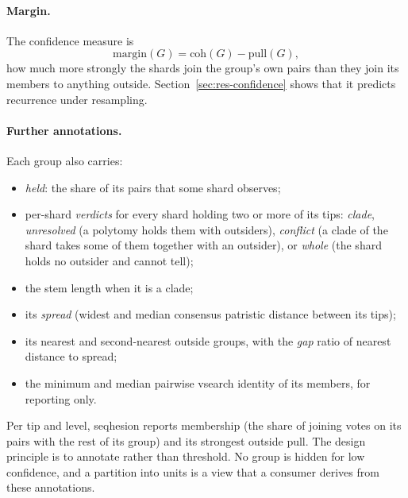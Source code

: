 \documentclass[11pt,a4paper]{article}
\newcommand{\seqhesion}{\textsf{seqhesion}}
\begin{document}
\paragraph{Margin.} The confidence measure is
\begin{equation}
  \mathrm{margin}(G) = \mathrm{coh}(G) - \mathrm{pull}(G),
\end{equation}
how much more strongly the shards join the group's own pairs than they join its members to
anything outside. Section~\ref{sec:res-confidence} shows that it predicts recurrence under
resampling.

\paragraph{Further annotations.}
Each group also carries:
\begin{itemize}
  \item \emph{held}: the share of its pairs that some shard observes;
  \item per-shard \emph{verdicts} for every shard holding two or more of its tips: \emph{clade},
        \emph{unresolved} (a polytomy holds them with outsiders), \emph{conflict} (a clade of the
        shard takes some of them together with an outsider), or \emph{whole} (the shard holds no
        outsider and cannot tell);
  \item the stem length when it is a clade;
  \item its \emph{spread} (widest and median consensus patristic distance between its tips);
  \item its nearest and second-nearest outside groups, with the \emph{gap} ratio of nearest
        distance to spread;
  \item the minimum and median pairwise vsearch identity of its members, for reporting only.
\end{itemize}
Per tip and level, \seqhesion{} reports membership (the share of joining votes on its pairs with
the rest of its group) and its strongest outside pull. The design principle is to annotate rather
than threshold. No group is hidden for low confidence, and a partition into units is a view that a
consumer derives from these annotations.
\end{document}
